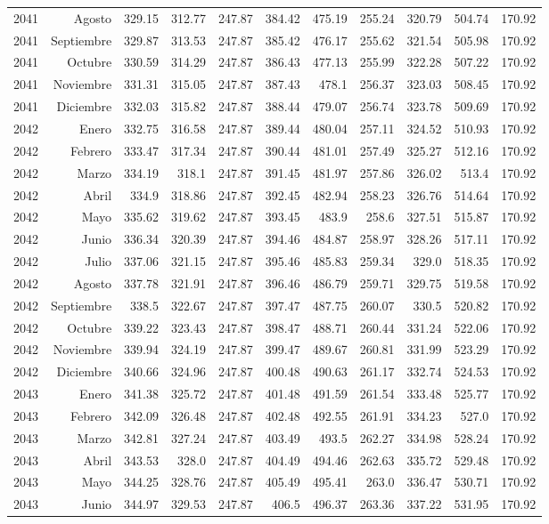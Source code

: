 \documentclass{article}%
\begin{document}
\begin{longtable}{|l r|r|r|r|r|r|r|r|r|r|}
2041&Agosto&329.15&312.77&247.87&384.42&475.19&255.24&320.79&504.74&170.92\\%
2041&Septiembre&329.87&313.53&247.87&385.42&476.17&255.62&321.54&505.98&170.92\\%
2041&Octubre&330.59&314.29&247.87&386.43&477.13&255.99&322.28&507.22&170.92\\%
2041&Noviembre&331.31&315.05&247.87&387.43&478.1&256.37&323.03&508.45&170.92\\%
2041&Diciembre&332.03&315.82&247.87&388.44&479.07&256.74&323.78&509.69&170.92\\%
2042&Enero&332.75&316.58&247.87&389.44&480.04&257.11&324.52&510.93&170.92\\%
2042&Febrero&333.47&317.34&247.87&390.44&481.01&257.49&325.27&512.16&170.92\\%
2042&Marzo&334.19&318.1&247.87&391.45&481.97&257.86&326.02&513.4&170.92\\%
2042&Abril&334.9&318.86&247.87&392.45&482.94&258.23&326.76&514.64&170.92\\%
2042&Mayo&335.62&319.62&247.87&393.45&483.9&258.6&327.51&515.87&170.92\\%
2042&Junio&336.34&320.39&247.87&394.46&484.87&258.97&328.26&517.11&170.92\\%
2042&Julio&337.06&321.15&247.87&395.46&485.83&259.34&329.0&518.35&170.92\\%
2042&Agosto&337.78&321.91&247.87&396.46&486.79&259.71&329.75&519.58&170.92\\%
2042&Septiembre&338.5&322.67&247.87&397.47&487.75&260.07&330.5&520.82&170.92\\%
2042&Octubre&339.22&323.43&247.87&398.47&488.71&260.44&331.24&522.06&170.92\\%
2042&Noviembre&339.94&324.19&247.87&399.47&489.67&260.81&331.99&523.29&170.92\\%
2042&Diciembre&340.66&324.96&247.87&400.48&490.63&261.17&332.74&524.53&170.92\\%
2043&Enero&341.38&325.72&247.87&401.48&491.59&261.54&333.48&525.77&170.92\\%
2043&Febrero&342.09&326.48&247.87&402.48&492.55&261.91&334.23&527.0&170.92\\%
2043&Marzo&342.81&327.24&247.87&403.49&493.5&262.27&334.98&528.24&170.92\\%
2043&Abril&343.53&328.0&247.87&404.49&494.46&262.63&335.72&529.48&170.92\\%
2043&Mayo&344.25&328.76&247.87&405.49&495.41&263.0&336.47&530.71&170.92\\%
2043&Junio&344.97&329.53&247.87&406.5&496.37&263.36&337.22&531.95&170.92\\%

\end{longtable}
\end{document}
